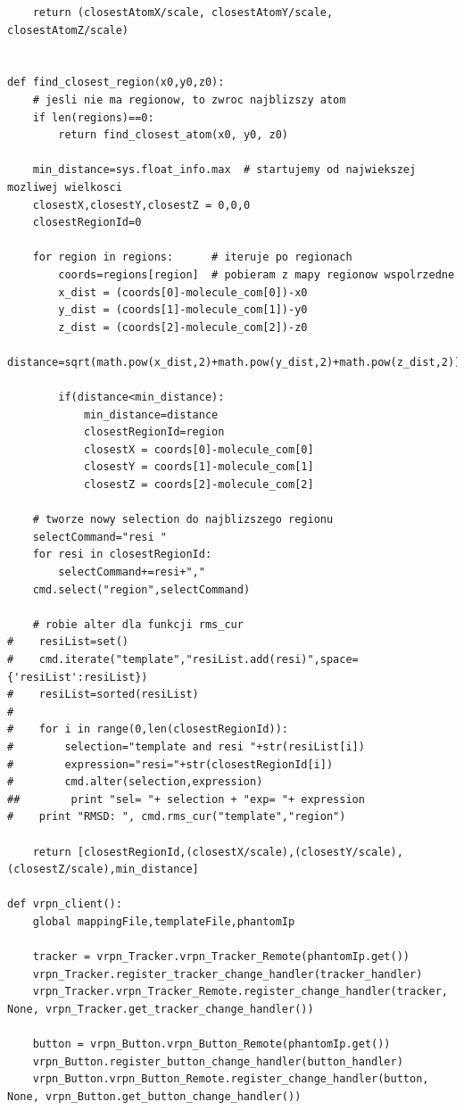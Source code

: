 \documentclass[licencjacka]{pracamgr}
\begin{document}
\begin{lstlisting}
    return (closestAtomX/scale, closestAtomY/scale, closestAtomZ/scale)
    
    
def find_closest_region(x0,y0,z0):
    # jesli nie ma regionow, to zwroc najblizszy atom
    if len(regions)==0:
        return find_closest_atom(x0, y0, z0)
    
    min_distance=sys.float_info.max  # startujemy od najwiekszej mozliwej wielkosci
    closestX,closestY,closestZ = 0,0,0
    closestRegionId=0
    
    for region in regions:      # iteruje po regionach
        coords=regions[region]  # pobieram z mapy regionow wspolrzedne
        x_dist = (coords[0]-molecule_com[0])-x0
        y_dist = (coords[1]-molecule_com[1])-y0
        z_dist = (coords[2]-molecule_com[2])-z0
        distance=sqrt(math.pow(x_dist,2)+math.pow(y_dist,2)+math.pow(z_dist,2))
        
        if(distance<min_distance):
            min_distance=distance
            closestRegionId=region
            closestX = coords[0]-molecule_com[0]
            closestY = coords[1]-molecule_com[1]
            closestZ = coords[2]-molecule_com[2]
    
    # tworze nowy selection do najblizszego regionu
    selectCommand="resi "
    for resi in closestRegionId: 
        selectCommand+=resi+","    
    cmd.select("region",selectCommand)
    
    # robie alter dla funkcji rms_cur
#    resiList=set()
#    cmd.iterate("template","resiList.add(resi)",space={'resiList':resiList})
#    resiList=sorted(resiList)
#
#    for i in range(0,len(closestRegionId)):
#        selection="template and resi "+str(resiList[i])
#        expression="resi="+str(closestRegionId[i])
#        cmd.alter(selection,expression)
##        print "sel= "+ selection + "exp= "+ expression
#    print "RMSD: ", cmd.rms_cur("template","region")
    
    return [closestRegionId,(closestX/scale),(closestY/scale),(closestZ/scale),min_distance]
    
def vrpn_client():
    global mappingFile,templateFile,phantomIp
    
    tracker = vrpn_Tracker.vrpn_Tracker_Remote(phantomIp.get())
    vrpn_Tracker.register_tracker_change_handler(tracker_handler)
    vrpn_Tracker.vrpn_Tracker_Remote.register_change_handler(tracker, None, vrpn_Tracker.get_tracker_change_handler())

    button = vrpn_Button.vrpn_Button_Remote(phantomIp.get())
    vrpn_Button.register_button_change_handler(button_handler)
    vrpn_Button.vrpn_Button_Remote.register_change_handler(button, None, vrpn_Button.get_button_change_handler())


\end{lstlisting}
\end{document}
